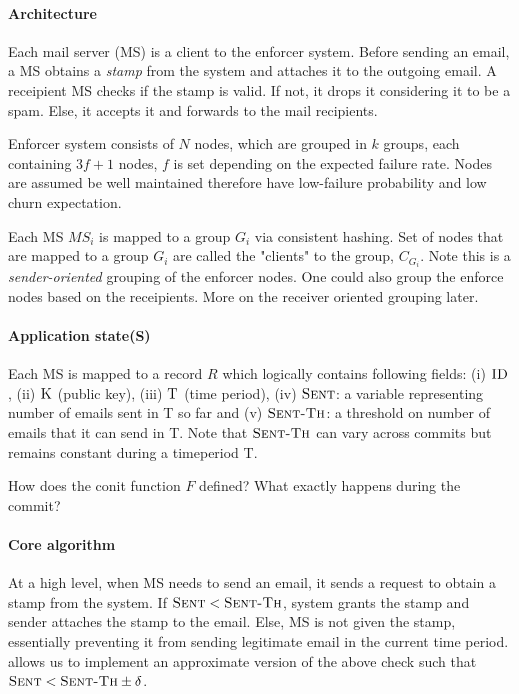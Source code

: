 \documentclass[twocolumn,10pt]{article}
\begin{document}
{\paragraph{Architecture}
Each mail server (MS) is a client to the enforcer system. Before sending an email, a MS
obtains a \emph{stamp} from the system and attaches it to the outgoing email. A receipient
MS checks if the stamp is valid. If not, it drops it considering it to be a spam. Else, it
accepts it and forwards to the mail recipients.

Enforcer system consists of $N$ nodes, which are grouped in $k$ groups, each containing 
$3f+1$ nodes, $f$ is set depending on the expected failure rate. Nodes are assumed be
well maintained therefore have low-failure probability and low churn expectation.

Each MS $MS_i$ is mapped to a group $G_i$ via consistent hashing. Set of nodes that are
mapped to a group $G_i$ are called the "clients" to the group, $C_{G_i}$. Note this is a 
\emph{sender-oriented} grouping of the enforcer nodes. One could also group the enforce
nodes based on the receipients. More on the receiver oriented grouping later.

\paragraph{Application state(S)} Each MS is mapped to a record $R$ which logically contains
following fields: (i) $\textsc{ID}$, (ii) $\textsc{K}$ (public key), (iii) $\textsc{T}$ (time period), (iv) $\textsc{Sent}$: a variable representing number of emails sent in T so far and (v) 
$\textsc{Sent-Th}$: a threshold on number of emails that it can send in T. Note that 
$\textsc{Sent-Th}$ can vary across commits but remains constant during a timeperiod T.

How does the conit function $F$ defined? What exactly happens during the commit?

\paragraph{Core algorithm} At a high level, when MS needs to send an email, it sends a request to obtain a stamp from the system. If $\textsc{Sent} < \textsc{Sent-Th}$, system grants the stamp and sender attaches the stamp to the email. Else, MS is not given the stamp, 
essentially preventing it from sending legitimate email in the current time period. \Sys allows us to implement an approximate version of the above check such that $\textsc{Sent} < \textsc{Sent-Th} \pm \delta$.



}
\end{document}
